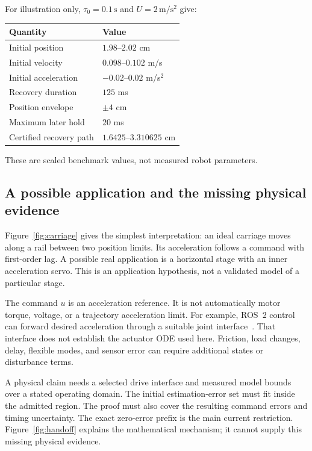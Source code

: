 \documentclass[10pt]{article}
\begin{document}
For illustration only, $\tau_0=0.1\,\mathrm{s}$ and $U=2\,\mathrm{m/s^2}$ give:
\begin{center}\small
\begin{tabular}{@{}ll@{}}
\toprule
Quantity & Value\\\midrule
Initial position & $1.98$--$2.02$ cm\\
Initial velocity & $0.098$--$0.102$ m/s\\
Initial acceleration & $-0.02$--$0.02$ m/s$^2$\\
Recovery duration & $125$ ms\\
Position envelope & $\pm4$ cm\\
Maximum later hold & $20$ ms\\
Certified recovery path & $1.6425$--$3.310625$ cm\\\bottomrule
\end{tabular}
\end{center}
These are scaled benchmark values, not measured robot parameters.

\subsection{A possible application and the missing physical evidence}
Figure~\ref{fig:carriage} gives the simplest interpretation: an ideal carriage moves along a rail between two position limits. Its acceleration follows a command with first-order lag. A possible real application is a horizontal stage with an inner acceleration servo. This is an application hypothesis, not a validated model of a particular stage.

The command $u$ is an acceleration reference. It is not automatically motor torque, voltage, or a trajectory acceleration limit. For example, ROS~2 control can forward desired acceleration through a suitable joint interface~\cite{rosaccel}. That interface does not establish the actuator ODE used here. Friction, load changes, delay, flexible modes, and sensor error can require additional states or disturbance terms.

A physical claim needs a selected drive interface and measured model bounds over a stated operating domain. The initial estimation-error set must fit inside the admitted region. The proof must also cover the resulting command errors and timing uncertainty. The exact zero-error prefix is the main current restriction. Figure~\ref{fig:handoff} explains the mathematical mechanism; it cannot supply this missing physical evidence.
\end{document}
